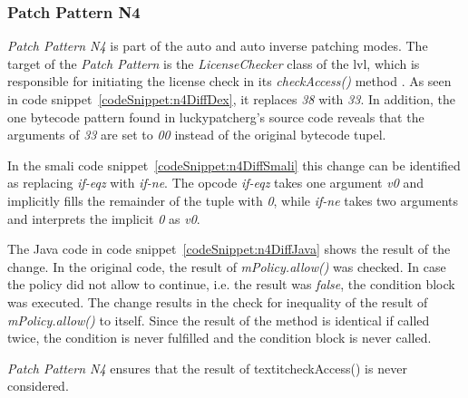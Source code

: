 \subsubsection{Patch Pattern N4}
 \textit{Patch Pattern N4} is part of the auto and auto inverse patching modes.
The target of the \textit{Patch Pattern} is the \textit{LicenseChecker} class of the \gls{lvl}, which is responsible for initiating the license check in its \textit{checkAccess()} method \cite{developersLicensingReference}.
\newline
As seen in code snippet~\ref{codeSnippet:n4DiffDex}, it replaces \textit{38} with \textit{33}.
In addition, the one bytecode pattern found in \gls{luckypatcherg}'s source code reveals that the arguments of \textit{33} are set to \textit{00} instead of the original bytecode tupel.

In the smali code snippet~\ref{codeSnippet:n4DiffSmali} this change can be identified as replacing \textit{if-eqz} with \textit{if-ne}.
The opcode \textit{if-eqz} takes one argument \textit{v0} and implicitly fills the remainder of the tuple with \textit{0}, while \textit{if-ne} takes two arguments and interprets the implicit \textit{0} as \textit{v0}.

The Java code in code snippet~\ref{codeSnippet:n4DiffJava} shows the result of the change.
In the original code, the result of \textit{mPolicy.allow()} was checked.
In case the policy did not allow to continue, i.e. the result was \textit{false}, the condition block was executed.
The change results in the check for inequality of the result of \textit{mPolicy.allow()} to itself.
Since the result of the method is identical if called twice, the condition is never fulfilled and the condition block is never called.

\textit{Patch Pattern N4} ensures that the result of textit{checkAccess()} is never considered.

